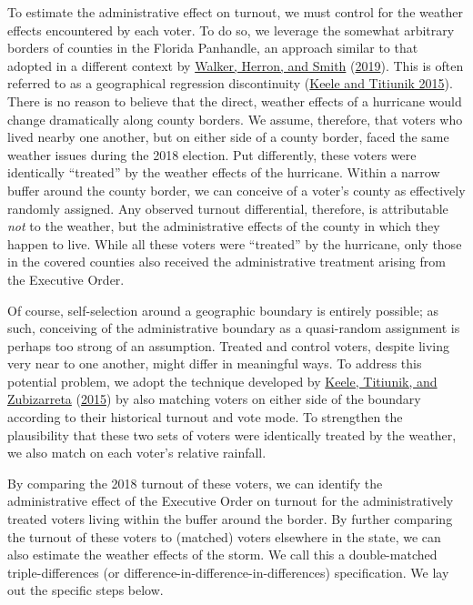\documentclass[
  12pt,
]{article}
\begin{document}
To estimate the administrative effect on turnout, we must control for the weather effects encountered by each voter. To do so, we leverage the somewhat arbitrary borders of counties in the Florida Panhandle, an approach similar to that adopted in a different context by \protect\hyperlink{ref-Walker2019}{Walker, Herron, and Smith} (\protect\hyperlink{ref-Walker2019}{2019}). This is often referred to as a geographical regression discontinuity (\protect\hyperlink{ref-Keele2015}{Keele and Titiunik 2015}). There is no reason to believe that the direct, weather effects of a hurricane would change dramatically along county borders. We assume, therefore, that voters who lived nearby one another, but on either side of a county border, faced the same weather issues during the 2018 election. Put differently, these voters were identically ``treated'' by the weather effects of the hurricane. Within a narrow buffer around the county border, we can conceive of a voter's county as effectively randomly assigned. Any observed turnout differential, therefore, is attributable \emph{not} to the weather, but the administrative effects of the county in which they happen to live. While all these voters were ``treated'' by the hurricane, only those in the covered counties also received the administrative treatment arising from the Executive Order.

Of course, self-selection around a geographic boundary is entirely possible; as such, conceiving of the administrative boundary as a quasi-random assignment is perhaps too strong of an assumption. Treated and control voters, despite living very near to one another, might differ in meaningful ways. To address this potential problem, we adopt the technique developed by \protect\hyperlink{ref-Keele2015a}{Keele, Titiunik, and Zubizarreta} (\protect\hyperlink{ref-Keele2015a}{2015}) by also matching voters on either side of the boundary according to their historical turnout and vote mode. To strengthen the plausibility that these two sets of voters were identically treated by the weather, we also match on each voter's relative rainfall.

By comparing the 2018 turnout of these voters, we can identify the administrative effect of the Executive Order on turnout for the administratively treated voters living within the buffer around the border. By further comparing the turnout of these voters to (matched) voters elsewhere in the state, we can also estimate the weather effects of the storm. We call this a double-matched triple-differences (or difference-in-difference-in-differences) specification. We lay out the specific steps below.
\end{document}
